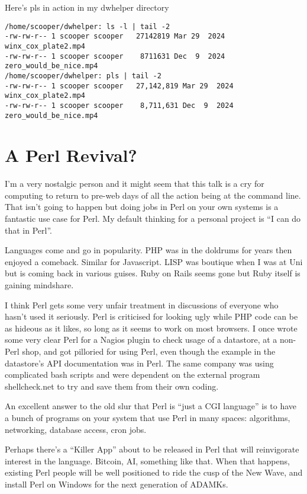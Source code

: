 \documentclass{article}
\begin{document}
Here's pls in action in my dwhelper directory
\begin{verbatim}
/home/scooper/dwhelper: ls -l | tail -2
-rw-rw-r-- 1 scooper scooper   27142819 Mar 29  2024 winx_cox_plate2.mp4
-rw-rw-r-- 1 scooper scooper    8711631 Dec  9  2024 zero_would_be_nice.mp4
/home/scooper/dwhelper: pls | tail -2
-rw-rw-r-- 1 scooper scooper   27,142,819 Mar 29  2024 winx_cox_plate2.mp4
-rw-rw-r-- 1 scooper scooper    8,711,631 Dec  9  2024 zero_would_be_nice.mp4
\end{verbatim}

\section{A Perl Revival?}

I'm a very nostalgic person and it might seem that this talk is a cry
for computing to return to pre-web days of all the action being at the
command line. That isn't going to happen but doing jobs in Perl on
your own systems is a fantastic use case for Perl. My default thinking
for a personal project is ``I can do that in Perl''.

Languages come and go in popularity. PHP was in the doldrums for years
then enjoyed a comeback. Similar for Javascript. LISP was boutique
when I was at Uni but is coming back in various guises. Ruby on Rails
seems gone but Ruby itself is gaining mindshare.

I think Perl gets some very unfair treatment in discussions of
everyone who hasn't used it seriously. Perl is criticised for looking
ugly while PHP code can be as hideous as it likes, so long as it seems
to work on most browsers. I once wrote some very clear Perl for a
Nagios plugin to check usage of a datastore, at a non-Perl shop, and
got pilloried for using Perl, even though the example in the
datastore's API documentation was in Perl. The same company was using
complicated bash scripts and were dependent on the external program
shellcheck.net to try and save them from their own coding.

An excellent answer to the old slur that Perl is ``just a CGI
language'' is to have a bunch of programs on your system that use Perl
in many spaces: algorithms, networking, database access, cron jobs.

Perhaps there's a ``Killer App'' about to be released in Perl that
will reinvigorate interest in the language. Bitcoin, AI, something
like that. When that happens, existing Perl people will be well
positioned to ride the cusp of the New Wave, and install Perl on
Windows for the next generation of ADAMKs.
\end{document}
